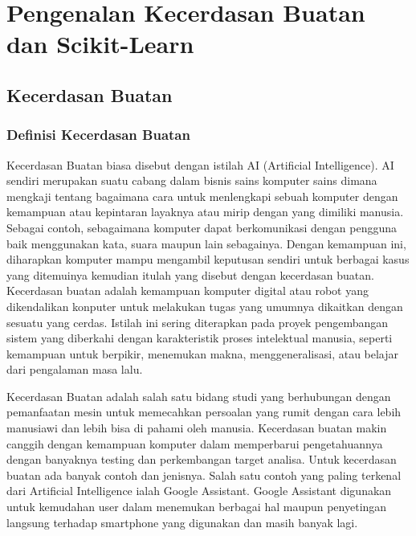 \chapter{Pengenalan Kecerdasan Buatan dan Scikit-Learn}
\section{Kecerdasan Buatan}
\subsection{Definisi Kecerdasan Buatan}
    Kecerdasan Buatan biasa disebut dengan istilah AI (Artificial Intelligence). AI sendiri merupakan suatu cabang dalam bisnis sains komputer sains dimana mengkaji tentang bagaimana cara untuk menlengkapi sebuah komputer dengan kemampuan atau kepintaran layaknya atau mirip dengan yang dimiliki manusia. Sebagai contoh, sebagaimana komputer dapat berkomunikasi dengan pengguna baik menggunakan kata, suara maupun lain sebagainya. Dengan kemampuan ini, diharapkan komputer mampu mengambil keputusan sendiri untuk berbagai kasus yang ditemuinya kemudian itulah yang disebut dengan kecerdasan buatan. Kecerdasan buatan adalah kemampuan komputer digital atau robot yang dikendalikan konputer untuk melakukan tugas yang umumnya dikaitkan dengan sesuatu yang cerdas. Istilah ini sering diterapkan pada proyek pengembangan sistem yang diberkahi dengan karakteristik proses intelektual manusia, seperti kemampuan untuk berpikir, menemukan makna, menggeneralisasi, atau belajar dari pengalaman masa lalu.

    Kecerdasan Buatan adalah salah satu bidang studi yang berhubungan dengan pemanfaatan mesin untuk memecahkan persoalan yang rumit dengan cara lebih manusiawi dan lebih bisa di pahami oleh manusia. Kecerdasan buatan makin canggih dengan kemampuan komputer dalam memperbarui pengetahuannya dengan banyaknya testing dan perkembangan target analisa. Untuk kecerdasan buatan ada banyak contoh dan jenisnya. Salah satu contoh yang paling terkenal dari Artificial Intelligence ialah Google Assistant. Google Assistant digunakan untuk kemudahan user dalam menemukan berbagai hal maupun penyetingan langsung terhadap smartphone yang digunakan dan masih banyak lagi.

